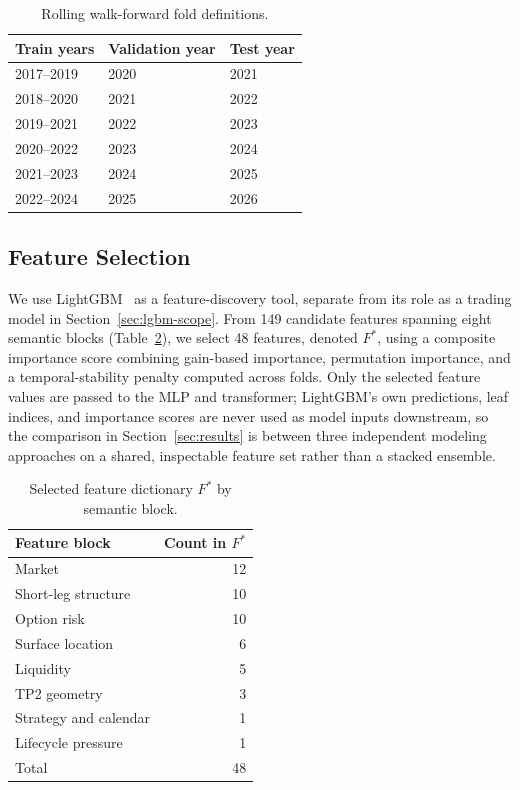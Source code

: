 \documentclass[sigconf,review,anonymous]{acmart}
\begin{document}
\begin{table}[H]
\centering
\small
\begin{tabular}{lll}
\toprule
Train years & Validation year & Test year \\
\midrule
2017--2019 & 2020 & 2021 \\
2018--2020 & 2021 & 2022 \\
2019--2021 & 2022 & 2023 \\
2020--2022 & 2023 & 2024 \\
2021--2023 & 2024 & 2025 \\
2022--2024 & 2025 & 2026 \\
\bottomrule
\end{tabular}
\caption{Rolling walk-forward fold definitions.}
\label{tab:folds}
\end{table}

\subsection{Feature Selection}
We use LightGBM~\cite{ke2017lightgbm} as a feature-discovery tool, separate from its role as a trading model in Section~\ref{sec:lgbm-scope}. From 149 candidate features spanning eight semantic blocks (Table~\ref{tab:featureblocks}), we select 48 features, denoted $F^{\ast}$, using a composite importance score combining gain-based importance, permutation importance, and a temporal-stability penalty computed across folds. Only the selected feature values are passed to the MLP and transformer; LightGBM's own predictions, leaf indices, and importance scores are never used as model inputs downstream, so the comparison in Section~\ref{sec:results} is between three independent modeling approaches on a shared, inspectable feature set rather than a stacked ensemble.

\begin{table}[H]
\centering
\small
\begin{tabular}{lr}
\toprule
Feature block & Count in $F^{\ast}$ \\
\midrule
Market & 12 \\
Short-leg structure & 10 \\
Option risk & 10 \\
Surface location & 6 \\
Liquidity & 5 \\
TP2 geometry & 3 \\
Strategy and calendar & 1 \\
Lifecycle pressure & 1 \\
\midrule
Total & 48 \\
\bottomrule
\end{tabular}
\caption{Selected feature dictionary $F^{\ast}$ by semantic block.}
\label{tab:featureblocks}
\end{table}
\end{document}

